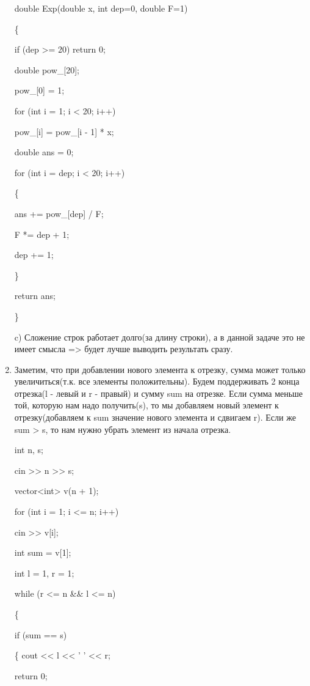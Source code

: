 \documentclass[12pt]{article}
\begin{document}
\begin{enumerate}
double Exp(double x, int dep=0, double F=1) 

\{

\qquad if (dep >= 20) return 0;

\qquad double pow\_[20];

\qquad pow\_[0] = 1;

\qquad for (int i = 1; i < 20; i++)

\qquad\qquad pow\_[i] = pow\_[i - 1] * x;

\qquad double ans = 0;

\qquad for (int i = dep; i < 20; i++)

\qquad\{

\qquad\qquad ans += pow\_[dep] / F;

\qquad\qquad F *= dep + 1;

\qquad\qquad dep += 1;

\qquad\}

\qquad return ans;

\}


c) Сложение строк работает долго(за длину строки), а в данной задаче это не имеет смысла => будет лучше выводить результать сразу. 

\item %
Заметим, что при добавлении нового элемента к отрезку, сумма может только увеличиться(т.к. все элементы положительны). Будем поддерживать 2 конца отрезка(l - левый и r - правый) и сумму sum на отрезке. Если сумма меньше той, которую нам надо получить(s), то мы добавляем новый элемент к отрезку(добавляем к sum значение нового элемента и сдвигаем r). Если же sum > s, то нам нужно убрать элемент из начала отрезка.

   int n, s;

    cin >> n >> s;
    
    vector<int> v(n + 1);
    
    for (int i = 1; i <= n; i++)
    
        \qquad cin >> v[i];
        
    int sum = v[1];
    
    int l = 1, r = 1;
    
    while (r <= n \&\& l <= n)
    
    \{
    
        \qquad if (sum == s)
        
        \qquad \{
            \qquad cout << l << ' ' << r;
            
            \qquad \qquad return 0;
            

\end{enumerate}
\end{document}
